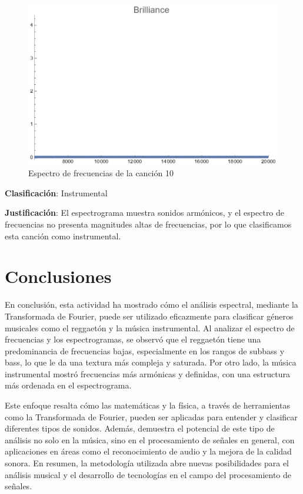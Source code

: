 \documentclass[12pt, letterpaper]{article}
\begin{document}
\begin{figure}[H]
\begin{minipage}{.3\textwidth}
  \end{minipage}
  \begin{minipage}{0.03\textwidth}\end{minipage}
  \begin{minipage}{.3\textwidth}
    \centering
    \includegraphics[width=.9\linewidth]{imgs/Cancion10/brilliance.png}
  \end{minipage}
  \caption{Espectro de frecuencias de la canción 10}
  \label{fig:esp010}
\end{figure}

\textbf{Clasificación}: Instrumental

\textbf{Justificación}: El espectrograma muestra sonidos armónicos, y el
espectro de frecuencias no presenta magnitudes altas de frecuencias, por lo que
clasificamos esta canción como instrumental.

\newpage

\section{Conclusiones}

En conclusión, esta actividad ha mostrado cómo el análisis espectral, mediante la Transformada de Fourier, 
puede ser utilizado eficazmente para clasificar géneros musicales como el reggaetón y la música instrumental. 
Al analizar el espectro de frecuencias y los espectrogramas, se observó que el reggaetón tiene una predominancia 
de frecuencias bajas, especialmente en los rangos de subbass y bass, lo que le da una textura más compleja y saturada. 
Por otro lado, la música instrumental mostró frecuencias más armónicas y definidas, con una estructura más ordenada en el espectrograma.

Este enfoque resalta cómo las matemáticas y la física, a través de herramientas como la Transformada de Fourier, 
pueden ser aplicadas para entender y clasificar diferentes tipos de sonidos. Además, demuestra el potencial de este 
tipo de análisis no solo en la música, sino en el procesamiento de señales en general, con aplicaciones en áreas como 
el reconocimiento de audio y la mejora de la calidad sonora. En resumen, la metodología utilizada abre nuevas 
posibilidades para el análisis musical y el desarrollo de tecnologías en el campo del procesamiento de señales.
\end{document}
